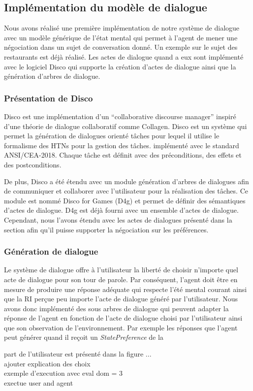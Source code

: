 \documentclass [french]{sig-alternate-05-2015}
\begin{document}
\subsection{Implémentation du modèle de dialogue}

\par Nous avons réalisé une première implémentation de notre système de dialogue avec un modèle générique de l'état mental qui permet à l'agent de mener une négociation dans un sujet de conversation donné. Un exemple sur le sujet des restaurants est déjà réalisé. Les actes de dialogue quand a eux sont implémenté avec le logiciel Disco \cite{rich2009building} qui supporte la création d'actes de dialogue ainsi que la génération d'arbres de dialogue.

\subsubsection{Présentation de Disco}
Disco est une implémentation d'un ``collaborative discourse manager'' inspiré d'une théorie de dialogue collaboratif comme Collagen.  Disco est un système qui permet la génération de dialogues orienté tâches pour lequel il utilise le formalisme des HTNs pour la gestion des tâches. implémenté avec le standard ANSI/CEA-2018.
Chaque tâche est définit avec des préconditions, des effets et des postconditions. 
\par De plus, Disco a été étendu avec un module génération d'arbres de dialogues afin de communiquer et collaborer avec l'utilisateur pour la réalisation des tâches. Ce module est nommé Disco for Games (D4g) et permet de définir des sémantiques d'actes de dialogue. D4g est déjà fourni avec un ensemble d'actes de dialogue. Cependant, nous l'avons étendu avec les actes de dialogues présenté dans la section \label{contribution} afin qu'il puisse supporter la négociation sur les préférences. 
\subsubsection{Génération de dialogue} 
 \par Le système de dialogue offre à l'utilisateur la liberté de choisir n'importe quel acte de dialogue pour son tour de parole. Par conséquent, l'agent doit être en mesure de produire une réponse adéquate qui respecte l'été mental courant ainsi que la RI perçue peu importe l'acte de dialogue généré par l'utilisateur. Nous avons donc implémenté des sous arbres de dialogue qui peuvent adapter la réponse de l'agent en fonction de  l'acte de dialogue choisi par l'utilisateur ainsi que son observation de l'environnement. Par exemple les réponses que l'agent peut générer quand il reçoit un \emph{StatePreference} de la 
 {\color{blue}
 
 part de l'utilisateur est présenté dans la figure ... 
 \\ ajouter explication des choix
 \\ exemple d'execution avec eval dom = 3 
 \\exectue user and agent
}
\end{document}
